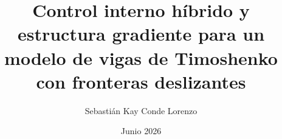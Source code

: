 
\newcommand{\Estudios}{Máster Universitario}

\newcommand{\TituloEstudios}{Matemáticas Avanzadas}

\newcommand{\Departamento}{Departamento de Matemática Aplicada a las Tecnologías de la Información y las Comunicaciones}

\newcommand{\NombreAutor}{Sebastián Kay Conde Lorenzo}

\newcommand{\NombreTutor}{Paulo Nicanor Seminario Huertas}

\newcommand{\TituloTFM}{Control interno híbrido y estructura gradiente para un modelo de vigas de Timoshenko con 
fronteras deslizantes}

\newcommand{\Fecha}{Junio 2026}

\title{\TituloTFM}
\author{\NombreAutor}
\date{\Fecha}

